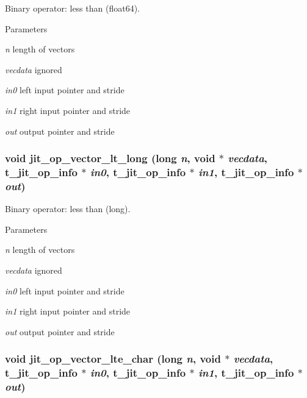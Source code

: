 Binary operator: less than (float64). 
\begin{DoxyParams}{Parameters}
\item[{\em n}]length of vectors \item[{\em vecdata}]ignored \item[{\em in0}]left input pointer and stride \item[{\em in1}]right input pointer and stride \item[{\em out}]output pointer and stride \end{DoxyParams}
\hypertarget{group__opvecmod_gaa4cb0f4c15c7b67c371696298b705474}{
\subsubsection[{jit\_\-op\_\-vector\_\-lt\_\-long}]{\setlength{\rightskip}{0pt plus 5cm}void jit\_\-op\_\-vector\_\-lt\_\-long (long {\em n}, \/  void $\ast$ {\em vecdata}, \/  {\bf t\_\-jit\_\-op\_\-info} $\ast$ {\em in0}, \/  {\bf t\_\-jit\_\-op\_\-info} $\ast$ {\em in1}, \/  {\bf t\_\-jit\_\-op\_\-info} $\ast$ {\em out})}}
\label{group__opvecmod_gaa4cb0f4c15c7b67c371696298b705474}


Binary operator: less than (long). 
\begin{DoxyParams}{Parameters}
\item[{\em n}]length of vectors \item[{\em vecdata}]ignored \item[{\em in0}]left input pointer and stride \item[{\em in1}]right input pointer and stride \item[{\em out}]output pointer and stride \end{DoxyParams}
\hypertarget{group__opvecmod_ga555351ea64c1fe8079afefd0496fbbdf}{
\subsubsection[{jit\_\-op\_\-vector\_\-lte\_\-char}]{\setlength{\rightskip}{0pt plus 5cm}void jit\_\-op\_\-vector\_\-lte\_\-char (long {\em n}, \/  void $\ast$ {\em vecdata}, \/  {\bf t\_\-jit\_\-op\_\-info} $\ast$ {\em in0}, \/  {\bf t\_\-jit\_\-op\_\-info} $\ast$ {\em in1}, \/  {\bf t\_\-jit\_\-op\_\-info} $\ast$ {\em out})}}
\label{group__opvecmod_ga555351ea64c1fe8079afefd0496fbbdf}


